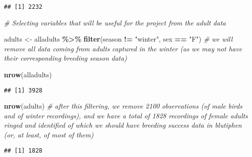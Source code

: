 \documentclass[
]{article}
\newenvironment{Shaded}{\begin{snugshade}}{\end{snugshade}}
\newcommand{\CommentTok}[1]{\textcolor[rgb]{0.56,0.35,0.01}{\textit{#1}}}
\newcommand{\FunctionTok}[1]{\textcolor[rgb]{0.13,0.29,0.53}{\textbf{#1}}}
\newcommand{\NormalTok}[1]{#1}
\newcommand{\OtherTok}[1]{\textcolor[rgb]{0.56,0.35,0.01}{#1}}
\newcommand{\SpecialCharTok}[1]{\textcolor[rgb]{0.81,0.36,0.00}{\textbf{#1}}}
\newcommand{\StringTok}[1]{\textcolor[rgb]{0.31,0.60,0.02}{#1}}
\begin{document}
\begin{verbatim}
## [1] 2232
\end{verbatim}

\begin{Shaded}
\begin{Highlighting}[]
\CommentTok{\# Selecting variables that will be useful for the project from the adult data}

\NormalTok{adults }\OtherTok{\textless{}{-}}\NormalTok{ alladults }\SpecialCharTok{\%\textgreater{}\%} \FunctionTok{filter}\NormalTok{(season }\SpecialCharTok{!=} \StringTok{"winter"}\NormalTok{, sex }\SpecialCharTok{==} \StringTok{"F"}\NormalTok{)  }\CommentTok{\# we will remove all data coming from adults captured in the winter (as we may not have their corresponding breeding season data)}

\FunctionTok{nrow}\NormalTok{(alladults)}
\end{Highlighting}
\end{Shaded}

\begin{verbatim}
## [1] 3928
\end{verbatim}

\begin{Shaded}
\begin{Highlighting}[]
\FunctionTok{nrow}\NormalTok{(adults)  }\CommentTok{\# after this filtering, we remove 2100 observations (of male birds and of winter recordings), and we have a total of 1828 recordings of female adults ringed and identified of which we should have breeding success data in blutiphen (or, at least, of most of them)}
\end{Highlighting}
\end{Shaded}

\begin{verbatim}
## [1] 1828
\end{verbatim}
\end{document}
